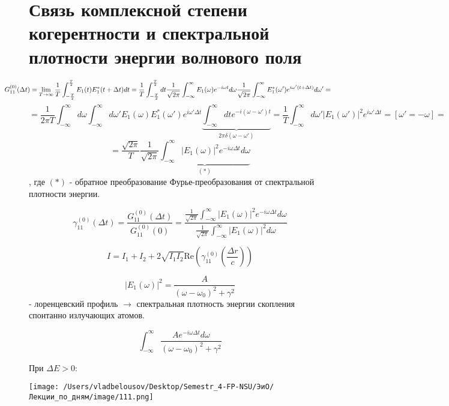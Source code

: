 \documentclass[12pt, a4paper]{report}
\begin{document}
\fi


\section{Связь комплексной степени когерентности и спектральной плотности энергии волнового поля} 

\[\kern-1.3cm G_{11}^{(0)}(\Delta t) = \lim_{T  \to \infty} \frac{1}{T }  \int_{-\frac{T}{2 } }^{\frac{T}{2 }  } E_1(t ) E_1 ^{* }  (t +\Delta t ) dt = \frac{1}{T }  \int_{-\frac{T}{2 } }^{\frac{T}{2 } } dt \frac{1}{\sqrt{2 \pi } } \int_{-\infty}^{\infty} E_1 (\omega ) e^{ - i \omega t } d \omega    \frac{1}{\sqrt{2 \pi } } \int_{-\infty}^{\infty} E_1 ^{* }  (\omega ' ) e^{i \omega ' (t + \Delta t )} d \omega ' =        \] 
\[ = \frac{1}{2 \pi T } \int_{-\infty}^{\infty}   d \omega \int_{-\infty}^{\infty}  d \omega ' E_1 ( \omega ) E_1 ^{* }  (\omega ' ) e^{i \omega ' \Delta t }\underbrace{ \int_{-\infty}^{\infty} dt e^{- i (\omega - \omega'  )t}}_{2 \pi \delta (\omega - \omega')} = \frac{1}{T }  \int_{-\infty}^{\infty} d \omega' |E_1 (\omega' )| ^2 e^{ i \omega ' \Delta t } = \left[ \omega' = -\omega \right]    = \] 
\[  =\frac{\sqrt{2 \pi } } {T } \frac{1}{\sqrt{2 \pi } } \underbrace{\int_{-\infty}^{\infty} |E_1(\omega )| ^2 e^{ - i \omega \Delta t } d \omega}_{(*)}   \] 
, где \( (*) \)  - обратное преобразование Фурье-преобразования от спектральной плотности энергии.

\[ \gamma_{11}^{(0 )}   (\Delta t ) = \frac{ G_{11} ^{(0 )} (\Delta t )}{G_{11}^{(0 )}  (0 )}= \frac{\displaystyle  \frac{1}{\sqrt{ 2 \pi } } \int_{-\infty}^{\infty} |E_1 (\omega )| ^2 e^{ - i \omega \Delta t }d \omega  }{\displaystyle  \frac{1}{ \sqrt{2 \pi }} \int_{-\infty}^{\infty} |E_1 (\omega )| ^2 d \omega }   \] 

\[ I = I_1 + I_2 + 2 \sqrt{I_1 I_2 } \mathrm{Re }  \left( \gamma_{11} ^{ (0 )} \left( \frac{\Delta r }{c}  \right) \right)   \] 

\[ |E_1 (\omega)| ^2 = \frac{A}{(\omega - \omega_0 ) ^2 + \gamma ^2 }   \]
- лоренцевский профиль \( \to  \) спектральная плотность энергии скопления спонтанно излучающих атомов. 

\[ \int_{-\infty}^{\infty} \frac{A e^{ - i \omega \Delta t }d \omega         }{(\omega - \omega_0 ) ^2 + \gamma ^2 }  \] 

При \( \Delta E > 0: \) 

\begin{center}
    \texttt{[image: /Users/vladbelousov/Desktop/Semestr\_4-FP-NSU/ЭиО/Лекции\_по\_дням/image/111.png]}
\end{center}
\end{document}
